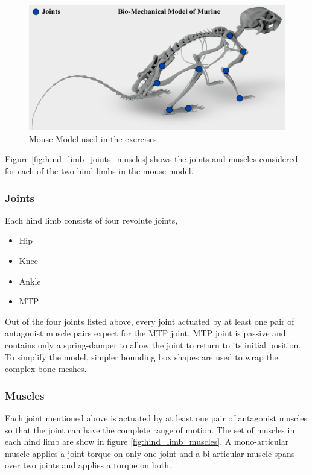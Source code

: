 \documentclass{cmc}
\begin{document}
\begin{figure}[H]
  \centering
  \includegraphics[width=\textwidth]{figures/mouse_model.png}
  \caption{Mouse Model used in the exercises}
  \label{fig:mouse}
\end{figure}

Figure \ref{fig:hind_limb_joints_muscles} shows the joints and muscles
considered for each of the two hind limbs in the mouse model.

\subsubsection*{Joints}
\label{sec:joints}

Each hind limb consists of four revolute joints,

\begin{itemize}
\item Hip
\item Knee
\item Ankle
\item MTP
\end{itemize}

Out of the four joints listed above, every joint actuated by at least
one pair of antagonist muscle pairs expect for the MTP joint. MTP
joint is passive and contains only a spring-damper to allow the joint
to return to its initial position.  To simplify the model, simpler
bounding box shapes are used to wrap the complex bone meshes.

\subsubsection*{Muscles}
\label{sec:muscles}

Each joint mentioned above is actuated by at least one pair of
antagonist muscles so that the joint can have the complete range of
motion. The set of muscles in each hind limb are show in figure
\ref{fig:hind_limb_muscles}. A mono-articular muscle applies a joint
torque on only one joint and a bi-articular muscle spans over two
joints and applies a torque on both.
\end{document}
